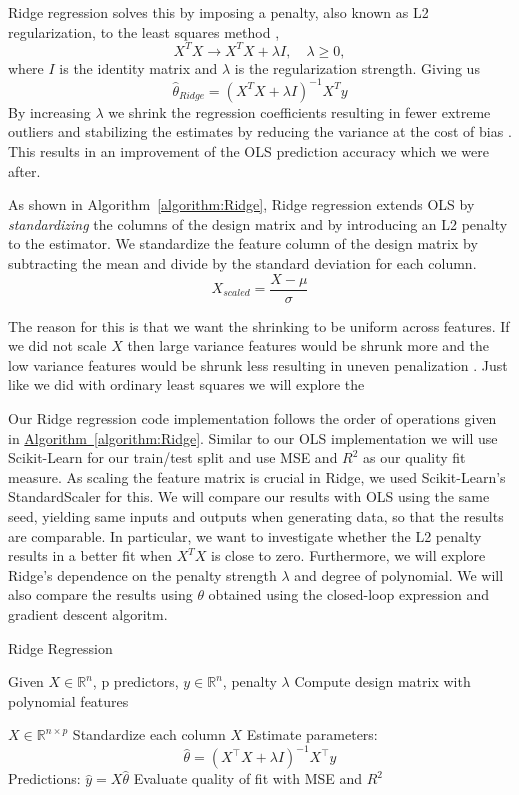 \documentclass[amssymb,twocolumn,aps]{revtex4}
\begin{document}
Ridge regression solves this by imposing a penalty, also known as L2 regularization, to the least squares method \cite{fysml2},
$$X^TX \to X^TX+\lambda I,\quad \lambda \geq 0,$$
where $I$ is the identity matrix and $\lambda$ is the regularization strength. Giving us
$$\hat{\theta}_{Ridge} = (X^TX+\lambda I)^{-1}X^Ty$$
By increasing $\lambda$ we shrink the regression coefficients resulting in fewer extreme outliers and stabilizing the estimates by reducing the variance at the cost of bias \cite{elestat1}. This results in an improvement of the OLS prediction accuracy which we were after.

As shown in Algorithm~\ref{algorithm:Ridge}, Ridge regression extends OLS by \textit{standardizing} the columns of the design matrix and by introducing an L2 penalty to the estimator. We standardize the feature column of the design matrix by subtracting the mean and divide by the standard deviation for each column.
$$X_{scaled} = \frac{X-\mu}{\sigma}$$

The reason for this is that we want the shrinking to be uniform across features. If we did not scale $X$ then large variance features would be shrunk more and the low variance features would be shrunk less  resulting in uneven penalization \cite{introstat1}. Just like we did with ordinary least squares we will explore the

Our Ridge regression code implementation follows the order of operations given in \hyperref[algorithm:Ridge]{Algorithm~\autoref{algorithm:Ridge}}. Similar to our OLS implementation we will use Scikit-Learn for our train/test split and use MSE and $R^2$ as our quality fit measure. As scaling the feature matrix is crucial in Ridge, we used Scikit-Learn's StandardScaler for this. We will compare our results with OLS using the same seed, yielding same inputs and outputs when generating data, so that the results are comparable. In particular, we want to investigate whether the L2 penalty results in a better fit when $X^TX$ is close to zero. Furthermore, we will explore Ridge's dependence on the penalty strength $\lambda$ and degree of polynomial. We will also compare the results using $\theta$ obtained using the closed-loop expression and gradient descent algoritm.

\begin{algorithm}[H]
    \caption{Ridge Regression}
    \label{algorithm:Ridge}
    \begin{algorithmic}[1]
        \State Given $X \in \mathbb{R}^{n}$, p predictors, $y \in \mathbb{R}^n$, penalty $\lambda$
        \State Compute design matrix with polynomial features

        $X \in \mathbb{R}^{n \times p}$
        \State Standardize each column $X$
        \State Estimate parameters:
        $$\hat{\theta} = (X^\top X + \lambda I)^{-1} X^\top y$$
        \State Predictions: $\hat{y} = X \hat{\theta}$
        \State Evaluate quality of fit with MSE and $R^2$
    \end{algorithmic}
\end{algorithm}
\end{document}
